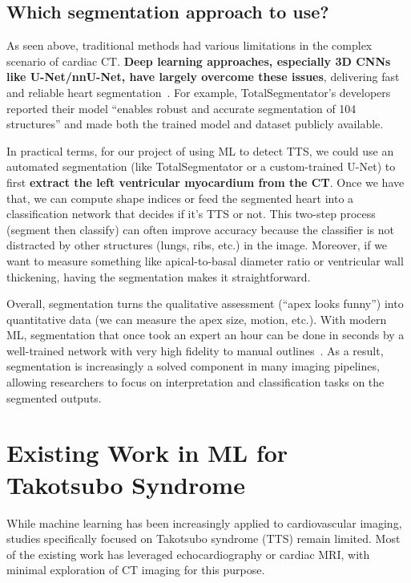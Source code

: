 \documentclass[12pt, BSc]{muthesis}
\begin{document}
\subsection{Which segmentation approach to use?}
As seen above, traditional methods had various limitations in the complex scenario of cardiac CT. \textbf{Deep learning approaches, especially 3D CNNs like U-Net/nnU-Net, have largely overcome these issues}, delivering fast and reliable heart segmentation~\cite{ronneberger2015unet, isensee2021nnunet, wasserthal2023totalsegmentator}. For example, TotalSegmentator’s developers reported their model “enables robust and accurate segmentation of 104 structures” and made both the trained model and dataset publicly available.

In practical terms, for our project of using ML to detect TTS, we could use an automated segmentation (like TotalSegmentator or a custom-trained U-Net) to first \textbf{extract the left ventricular myocardium from the CT}. Once we have that, we can compute shape indices or feed the segmented heart into a classification network that decides if it’s TTS or not. This two-step process (segment then classify) can often improve accuracy because the classifier is not distracted by other structures (lungs, ribs, etc.) in the image. Moreover, if we want to measure something like apical-to-basal diameter ratio or ventricular wall thickening, having the segmentation makes it straightforward.

Overall, segmentation turns the qualitative assessment (“apex looks funny”) into quantitative data (we can measure the apex size, motion, etc.). With modern ML, segmentation that once took an expert an hour can be done in seconds by a well-trained network with very high fidelity to manual outlines~\cite{wasserthal2023totalsegmentator, Chen2020Deep}. As a result, segmentation is increasingly a solved component in many imaging pipelines, allowing researchers to focus on interpretation and classification tasks on the segmented outputs.

\section{Existing Work in ML for Takotsubo Syndrome}
While machine learning has been increasingly applied to cardiovascular imaging, studies specifically focused on Takotsubo syndrome (TTS) remain limited. Most of the existing work has leveraged echocardiography or cardiac MRI, with minimal exploration of CT imaging for this purpose.
\end{document}
